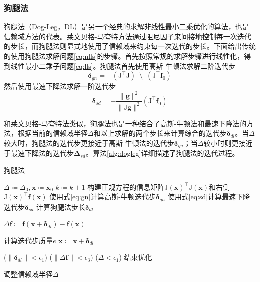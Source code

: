 \subsubsection*{狗腿法}

狗腿法（Dog-Leg，DL）是另一个经典的求解非线性最小二乘优化的算法，也是信赖域方法的代表。莱文贝格-马夸特方法通过阻尼因子来间接地控制每一次迭代的步长，而狗腿法则显式地使用了信赖域来约束每一次迭代的步长。下面给出传统的使用狗腿法求解问题\eqref{eq:nlls}的步骤\citep{tingleff2004methods}。首先按照常规的求解步骤进行线性化，得到线性最小二乘子问题\eqref{eq:lls}。狗腿法首先使用高斯-牛顿法求解二阶迭代步
\begin{equation}
    \bm{\delta}_{gn} =
        -\left( \mathrm{J}^\top\mathrm{J} \right)
        \enspace\setminus\enspace
        \left( \mathrm{J}^\top \mathbf{f}_0 \right)
    \label{eq:gn}
\end{equation}
然后使用最速下降法求解一阶迭代步
\begin{equation}
    \bm{\delta}_{sd} =
        -\frac{\lVert\bm{g}\rVert^2}{\lVert\mathrm{J}\bm{g}\rVert^2}
        \left( \mathrm{J}^\top \mathbf{f}_0 \right)
    \label{eq:sd}
\end{equation}

和莱文贝格-马夸特法类似，狗腿法也是一种结合了高斯-牛顿法和最速下降法的方法，根据当前的信赖域半径$\Delta$和以上求解的两个步长来计算综合的迭代步$\bm{\delta}_{dl}$。当$\Delta$较大时，狗腿法的迭代步更接近于高斯-牛顿法的迭代步$\bm{\delta}_{gn}$；当$\Delta$较小时则更接近于最速下降法的迭代步$\bm{\Delta}_{sd}$。算法\ref{alg:dogleg}详细描述了狗腿法的迭代过程。

\begin{algorithm}
\caption{狗腿法}
\begin{algorithmic}[1]
    \STATE $\Delta \coloneqq \Delta_0, \bm{x} \coloneqq \bm{x}_0$
        \STATE $k \coloneqq k+1$
        \STATE 构建正规方程的信息矩阵$\mathrm{J}(\bm{x})^\top \mathrm{J}(\bm{x})$和右侧$\mathrm{J}(\bm{x})^\top \mathbf{f}(\bm{x})$
        \STATE 使用式\eqref{eq:gn}计算高斯-牛顿迭代步$\bm{\delta}_{gn}$
        \STATE 使用式\eqref{eq:sd}计算最速下降迭代步$\bm{\delta}_{sd}$
        \STATE 计算狗腿法步长$\bm{\delta}_{dl}$

        \STATE $\Delta\mathbf{f} \coloneqq
                \mathbf{f}(\bm{x}+\bm{\delta}_{dl}) -
                \mathbf{f}(\bm{x})$

        \STATE 计算迭代步质量$e$
            \STATE $\bm{x} \coloneqq \bm{x} + \bm{\delta}_{dl}$
        \ENDIF

        \IF
        {
            ($\lVert\bm{\delta}_{dl}\rVert < \epsilon_1$) \OR
            ($\lVert\Delta\mathbf{f}\rVert < \epsilon_3$) \OR
            ($\Delta < \epsilon_1$)
        }
            \STATE 结束优化
        \ENDIF

        \STATE 调整信赖域半径$\Delta$
    \ENDFOR
\end{algorithmic}
\label{alg:dogleg}
\end{algorithm}

